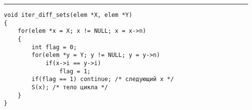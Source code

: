 \documentclass{article}
\begin{document}
\vspace{5pt} \hrule
\begin{lstlisting}[caption={Итератор разности множеств}, label=p_47_iter_diff_sets, escapechar=\%]
void iter_diff_sets(elem *X, elem *Y)
{
	for(elem *x = X; x != NULL; x = x->n)
	{
		int flag = 0;
		for(elem *y = Y; y != NULL; y = y->n)
			if(x->i == y->i)
				flag = 1;
		if(flag == 1) continue; /* следующий x */
		S(x); /* тело цикла */
	}
}
\end{lstlisting}
\end{document}
